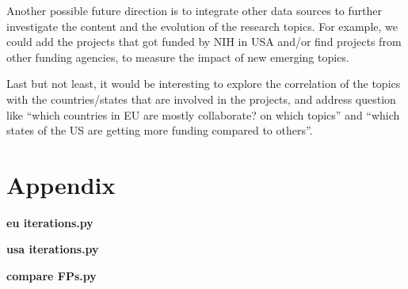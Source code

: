 \documentclass[12pt]{report}
\begin{document}
Another possible future direction is to integrate other data sources to further
investigate the content and the evolution of the research topics. For example,
we could add the projects that got funded by NIH in USA and/or find projects
from other funding agencies, to measure the impact of new emerging topics.

Last but not least, it would be interesting to explore the correlation
of the topics with the countries/states that are involved in the
projects, and address question like ``which countries in EU are mostly
collaborate? on which topics'' and ``which states of the US are getting
more funding compared to others''.

{}


\clearpage
\section{Appendix}

\textbf{eu iterations.py}



\textbf{usa iterations.py}



\textbf{compare FPs.py}


\end{document}
